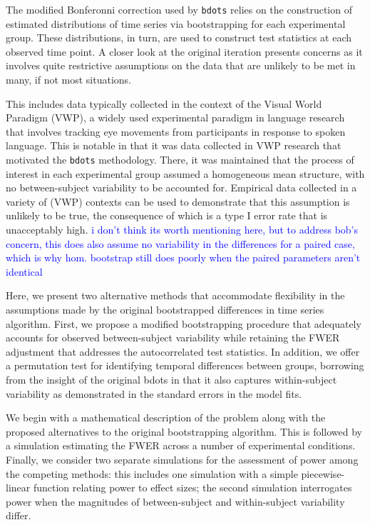 \documentclass{article}
\newcommand{\xt}{\texttt}
\providecommand{\cn}[1]{\textcolor{blue}{#1}}
\begin{document}
The modified Bonferonni correction used by \xt{bdots} relies on the construction of estimated distributions of time series via bootstrapping for each experimental group. These distributions, in turn, are used to construct test statistics at each observed time point. A closer look at the original iteration presents concerns as it involves quite restrictive assumptions on the data that are unlikely to be met in many, if not most situations. 

This includes data typically collected in the context of the Visual World Paradigm (VWP), a widely used experimental paradigm in language research that involves tracking eye movements from participants in response to spoken language. This is notable in that it was data collected in VWP research that motivated the \xt{bdots} methodology. There, it was maintained that the process of interest in each experimental group assumed a homogeneous mean structure, with no between-subject variability to be accounted for. Empirical data collected in a variety of (VWP) contexts can be used to demonstrate that this assumption is unlikely to be true, the consequence of which is a type I error rate that is unacceptably high. \cn{i don't think its worth mentioning here, but to address bob's concern, this does also assume no variability in the differences for a paired case, which is why hom. bootstrap still does poorly when the paired parameters aren't identical}



Here, we present two alternative methods that accommodate flexibility in the assumptions made by the original bootstrapped differences in time series algorithm. First, we propose a modified bootstrapping procedure that adequately accounts for observed between-subject variability while retaining the FWER adjustment that addresses the autocorrelated test statistics. In addition, we offer a permutation test for identifying temporal differences between groups, borrowing from the insight of the original bdots in that it also captures within-subject variability as demonstrated in the standard errors in the model fits.

We begin with a mathematical description of the problem along with the proposed alternatives to the original bootstrapping algorithm. This is followed by a simulation estimating the FWER across a number of experimental conditions. Finally, we consider two separate simulations for the assessment of power among the competing methods: this includes one simulation with a simple piecewise-linear function relating power to effect sizes; the second simulation interrogates power when the magnitudes of between-subject and within-subject variability differ. 
\end{document}
